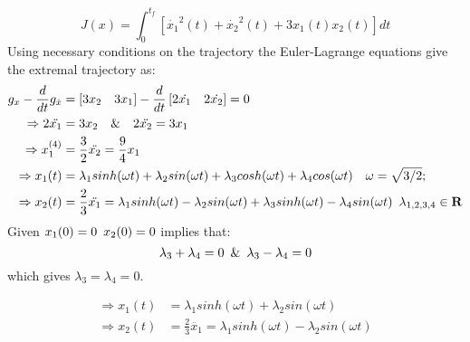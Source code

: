 \begin{enumerate}
  \begin{equation}
    J(x) = \int_0^{t_f} [{\dot{x_1}}^2(t) + {\dot{x_2}}^2(t) + 3 x_1(t) x_2(t) ] dt
  \end{equation}
  Using necessary conditions on the trajectory the Euler-Lagrange equations give the extremal trajectory as:
  \begin{align*}
  g_x - \frac{d}{dt} g_{\dot x}  &= \left[ 3 x_2 \quad 3 x_1\right] - \frac{d}{dt} \left[ 2 \dot{x_1}\quad 2\dot{x_2}\right] = 0\\
  \Rightarrow 2 \ddot{x_1} &= 3 x_2 \quad \& \quad 2 \ddot{x_2} = 3 x_1 \\
  \Rightarrow x_1^{(4)} &= \frac{3}{2} \ddot{x_2} = \frac{9}{4} x_1 \\
  \Rightarrow x_1(t) &= \lambda_1 sinh(\omega t) + \lambda_2 sin(\omega t) + \lambda_3 cosh(\omega t) + \lambda_4 cos(\omega t) \quad \omega = \sqrt{3/2};\\
  \Rightarrow x_2(t) &= \frac{2}{3} \ddot{x_1} = \lambda_1 sinh(\omega t) - \lambda_2 sin(\omega t) + \lambda_3 sinh(\omega t) - \lambda_4 sin(\omega t) \enskip \lambda_{1,2,3,4} \in \mathbf{R}\\
  \end{align*}
  Given $x_1(0) = 0 \enskip x_2(0) = 0$ implies that:
  \begin{equation*}
   \lambda_3 + \lambda_4 = 0 \enskip \& \enskip \lambda_3 - \lambda_4 = 0
  \end{equation*}
  which gives $\lambda_3 = \lambda_4 = 0$.
  
  \begin{align}
  \Rightarrow x_1(t) &= \lambda_1 sinh(\omega t) + \lambda_2 sin(\omega t) \\
  \Rightarrow x_2(t) &= \frac{2}{3} \ddot{x_1} = \lambda_1 sinh(\omega t) - \lambda_2 sin(\omega t) \label{eqn:2.bxt} 
  \end{align}


\end{enumerate}
